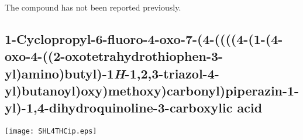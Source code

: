 \\[1\baselineskip]
\\[1\baselineskip]
\\[1\baselineskip]
The compound has not been reported previously.


\subsection{1\hyp{}Cyclopropyl\hyp{}6\hyp{}fluoro\hyp{}4\hyp{}oxo\hyp{}7\hyp{}(4\hyp{}((((4\hyp{}(1\hyp{}(4\hyp{}oxo\hyp{}4\hyp{}((2\hyp{}oxotetrahydrothioph\allowbreak e\allowbreak n\allowbreak \hyp{}3\hyp{}yl)amino)butyl)\hyp{}1\textit{H}\hyp{}1,2,3\hyp{}triazol\hyp{}4\hyp{}yl)butanoyl)oxy)methoxy)carbonyl)\allowbreak pip\allowbreak e\allowbreak razin\hyp{}1\hyp{}yl)\hyp{}1,4\hyp{}dihydroquinoline\hyp{}3\hyp{}carboxylic acid }



\begin{scheme}[H]
	\begin{center}
		\texttt{[image: SHL4THCip.eps]}
	\end{center}
\end{scheme}

